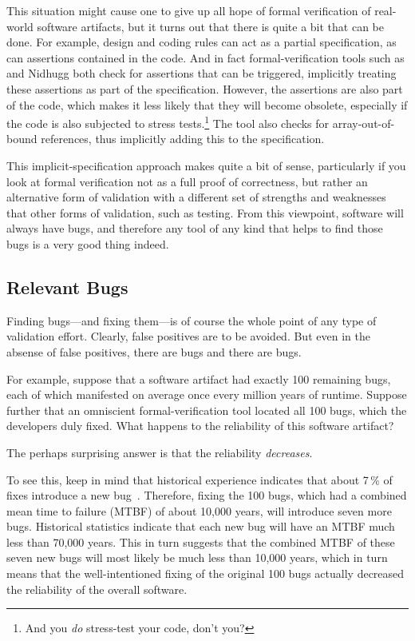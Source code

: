 This situation might cause one to give up all hope of formal verification
of real-world software artifacts, but it turns out that there is
quite a bit that can be done.
For example, design and coding rules can act as a partial specification,
as can assertions contained in the code.
And in fact formal-verification tools such as  and Nidhugg
both check for assertions that can be triggered, implicitly treating
these assertions as part of the specification.
However, the assertions are also part of the code, which makes it less
likely that they will become obsolete, especially if the code is
also subjected to stress tests.\footnote{
	And you \emph{do} stress-test your code, don't you?}
The  tool also checks for array-out-of-bound references,
thus implicitly adding this to the specification.

This implicit-specification approach makes quite a bit of sense, particularly
if you look at formal verification not as a full proof of correctness,
but rather an alternative form of validation with a different set of
strengths and weaknesses that other forms of validation, such as testing.
From this viewpoint, software will always have bugs, and therefore any
tool of any kind that helps to find those bugs is a very good thing
indeed.

\subsection{Relevant Bugs}
\label{sec:formal:Relevant Bugs}

Finding bugs---and fixing them---is of course the whole point of any
type of validation effort.
Clearly, false positives are to be avoided.
But even in the absense of false positives, there are bugs and there are bugs.

For example, suppose that a software artifact had exactly 100 remaining
bugs, each of which manifested on average once every million years
of runtime.
Suppose further that an omniscient formal-verification tool located
all 100 bugs, which the developers duly fixed.
What happens to the reliability of this software artifact?

The perhaps surprising answer is that the reliability \emph{decreases}.

To see this, keep in mind that historical experience indicates that
about 7\,\% of fixes introduce a new bug~\cite{RexBlack2012SQA}.
Therefore, fixing the 100 bugs, which had a combined mean time to failure
(MTBF) of about 10,000 years, will introduce seven more bugs.
Historical statistics indicate that each new bug will have an MTBF
much less than 70,000 years.
This in turn suggests that the combined MTBF of these seven new bugs
will most likely be much less than 10,000 years, which in turn means
that the well-intentioned fixing of the original 100 bugs actually
decreased the reliability of the overall software.

